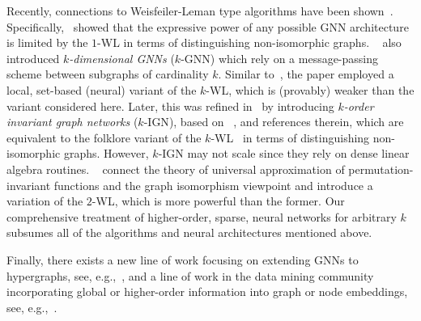 \documentclass{article}
\theoremstyle{definition}
\newcommand{\wl}{$1$-\textsf{WL}\xspace}
\newcommand{\kwl}{$k$-\textsf{WL}\xspace}
\newcommand{\kgnn}{$k$\textrm{-}\textsf{GNN}\xspace}
\newcommand{\kign}{$k$\textrm{-}\textsf{IGN}\xspace}
\begin{document}
Recently, connections to Weisfeiler-Leman type algorithms have been shown~\cite{Bar+2020,Che+2019,Gee+2020a,Gee+2020b,Mae+2019,Mar+2019,Mor+2019,Xu+2018b}. Specifically,~\cite{Mor+2019,Xu+2018b} showed that the expressive power of any possible GNN architecture is limited by the \wl in terms of distinguishing non-isomorphic graphs. \citeauthor{Mor+2019}~\cite{Mor+2019} also introduced \emph{$k$-dimensional GNNs} (\kgnn) which rely on a message-passing scheme between subgraphs of cardinality $k$. Similar to~\cite{Mor+2017}, the paper employed a local, set-based (neural) variant of the \kwl, which is (provably) weaker than the variant considered here. Later, this was refined in~\cite{Mar+2019} by introducing \emph{$k$-order invariant graph networks} (\kign), based on \citeauthor{Mar+2019b}~\cite{Mar+2019b}, and references therein, which are equivalent to the folklore variant of the \kwl~\cite{Gro2017} in terms of distinguishing non-isomorphic graphs. However, \kign may not scale since they rely on dense linear algebra routines. \citeauthor{Che+2019}~\cite{Che+2019} connect the theory of universal approximation of permutation-invariant functions and the graph isomorphism viewpoint and introduce a variation of the $2$-\textsf{WL}, which is more powerful than the former. Our comprehensive treatment of higher-order, sparse, neural networks for arbitrary $k$ subsumes all of the algorithms and neural architectures mentioned above.

Finally, there exists a new line of work focusing on extending GNNs to hypergraphs, see, e.g.,~\cite{Bai+2019,Yad+2019,Zha+2019}, and a line of work in the data mining community incorporating global or higher-order information into graph or node embeddings, see, e.g.,~\cite{Cao+2015,Lee+2019,Cha+2018}.
\end{document}
